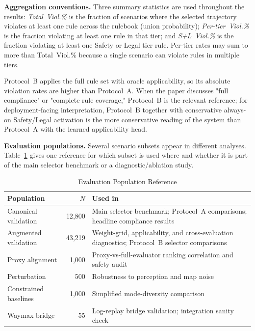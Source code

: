 \noindent\textbf{Aggregation conventions.}  Three summary statistics are used throughout the results: \emph{Total~Viol.\%} is the fraction of scenarios where the selected trajectory violates at least one rule across the rulebook (union probability); \emph{Per-tier~Viol.\%} is the fraction violating at least one rule in that tier; and \emph{S+L~Viol.\%} is the fraction violating at least one Safety or Legal tier rule. Per-tier rates may sum to more than Total~Viol.\% because a single scenario can violate rules in multiple tiers.

\noindent Protocol~B applies the full rule set with oracle applicability, so its absolute violation rates are higher than Protocol~A. When the paper discusses "full compliance" or "complete rule coverage," Protocol~B is the relevant reference; for deployment-facing interpretation, Protocol~B together with conservative always-on Safety/Legal activation is the more conservative reading of the system than Protocol~A with the learned applicability head.

\noindent\textbf{Evaluation populations.} Several scenario subsets appear in different analyses. Table~\ref{tab:eval_populations} gives one reference for which subset is used where and whether it is part of the main selector benchmark or a diagnostic/ablation study.

\begin{table}
\centering
\caption{Evaluation Population Reference}
\label{tab:eval_populations}
\setlength{\tabcolsep}{3pt}
\begin{tabular}{lrl}
\toprule
\textbf{Population} & \textbf{$N$} & \textbf{Used in} \\
\midrule
Canonical validation & 12{,}800 & Main selector benchmark; Protocol~A comparisons; headline compliance results \\
Augmented validation & 43{,}219 & Weight-grid, applicability, and cross-evaluation diagnostics; Protocol~B selector comparisons \\
Proxy alignment & 1{,}000 & Proxy-vs-full-evaluator ranking correlation and safety audit \\
Perturbation & 500 & Robustness to perception and map noise \\
Constrained baselines & 1{,}000 & Simplified mode-diversity comparison \\
Waymax bridge & 55 & Log-replay bridge validation; integration sanity check \\
\bottomrule
\end{tabular}
\end{table}

